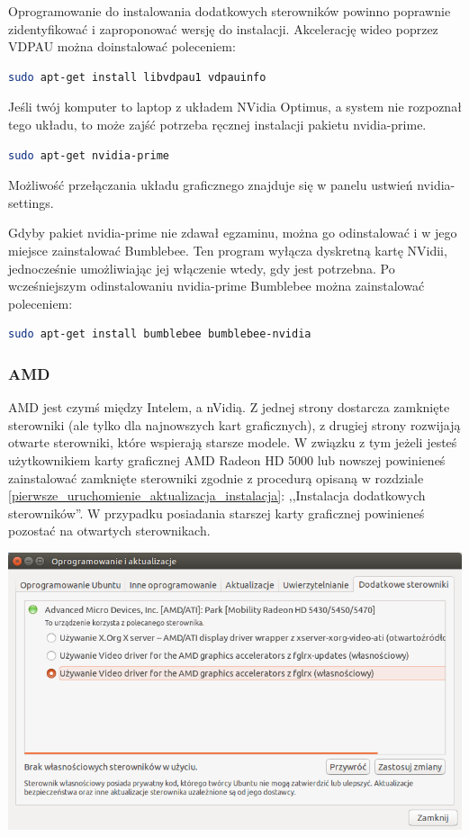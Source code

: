 Oprogramowanie do instalowania dodatkowych sterowników powinno poprawnie zidentyfikować i zaproponować wersję do instalacji.
Akcelerację wideo poprzez VDPAU można doinstalować poleceniem:

\begin{lstlisting}[language=bash]
sudo apt-get install libvdpau1 vdpauinfo
\end{lstlisting}

Jeśli twój komputer to laptop z układem NVidia Optimus, a system nie rozpoznał tego układu, to może zajść potrzeba ręcznej instalacji pakietu nvidia-prime. 

\begin{lstlisting}[language=bash]
sudo apt-get nvidia-prime
\end{lstlisting}

\noindent Możliwość przełączania układu graficznego znajduje się w panelu ustwień \textcolor{ubuntu_orange}{nvidia-settings}.

Gdyby pakiet nvidia-prime nie zdawał egzaminu, można go odinstalować i w jego miejsce zainstalować Bumblebee. Ten program wyłącza dyskretną kartę NVidii, jednocześnie umożliwiając jej włączenie wtedy, gdy jest potrzebna.
Po wcześniejszym odinstalowaniu nvidia-prime Bumblebee można zainstalować poleceniem:

\begin{lstlisting}[language=bash]
sudo apt-get install bumblebee bumblebee-nvidia
\end{lstlisting}

\subsubsection{AMD}
AMD jest czymś między Intelem, a nVidią. Z jednej strony dostarcza zamknięte sterowniki (ale tylko dla najnowszych kart graficznych), z drugiej strony rozwijają otwarte sterowniki, które wspierają starsze modele. W związku z tym jeżeli jesteś użytkownikiem karty graficznej AMD Radeon HD 5000 lub nowszej powinieneś zainstalować zamknięte sterowniki zgodnie z procedurą opisaną w rozdziale \ref{pierwsze_uruchomienie_aktualizacja_instalacja}: ,,Instalacja dodatkowych sterowników''. W przypadku posiadania starszej karty graficznej powinieneś pozostać na otwartych sterownikach.

\begin{center}
	\includegraphics[width=\linewidth]{images/sterowniki_AMD.png}
\end{center}


